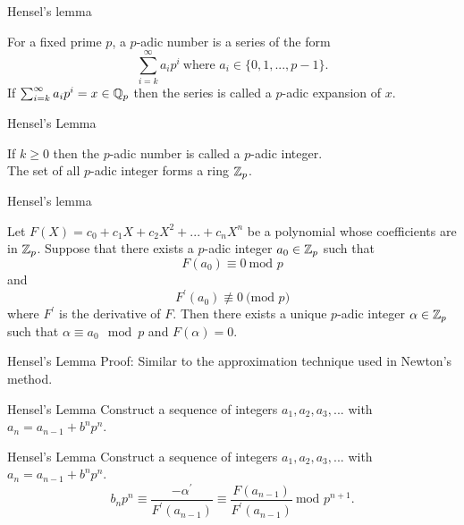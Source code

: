 \documentclass{beamer}
\begin{document}
    \begin{frame}{Hensel's lemma}
    
    \begin{definition}
        For a fixed prime $p$, a $p$-adic number is a series of the form 
\[\sum_{i=k}^{\infty} a_i p^i \ \text{where }a_i \in \{0,1,...,p - 1\}. \]
If $\sum_{i=k}^{\infty} a_i p^i = x \in \mathbb{Q}_p$ then the series is called a $p$-adic expansion of $x$.
    \end{definition}
    
    \end{frame}
    
    \begin{frame}{Hensel's Lemma}
    
    If $k \geq 0 $ then the $p$-adic number is called a $p$-adic integer.\\
    The set of all $p$-adic integer forms a ring $\mathbb{Z}_p$.
        
    \end{frame}
    
    \begin{frame}{Hensel's lemma}
    
    \begin{theorem} Let $F(X) = c_0 + c_1 X + c_2 X^2 + ... + c_n X^n$ be a polynomial whose coefficients are in $\mathbb{Z}_p$. Suppose that there exists a $p$-adic integer $a_0 \in \mathbb{Z}_p$ such that 
\[F(a_0) \equiv 0 \ \text{mod $p$} \]
and 
\[F^{'}(a_0) \not\equiv 0 \  \text{(mod $p$)}\]
where $F^{'}$ is the derivative of $F$. Then there exists a unique $p$-adic integer $\alpha \in \mathbb{Z}_p$ such that $\alpha \equiv a_0 \mod p$ and $F(\alpha) = 0$.
    \end{theorem}
        
    \end{frame}
    
    \begin{frame}{Hensel's Lemma}
    Proof:
        Similar to the approximation technique used in Newton's method.
    \end{frame}
    
    \begin{frame}{Hensel's Lemma}
    Construct a sequence of integers $a_1,a_2,a_3,...$ with $a_n = a_{n-1} + b^n p^n$.\\
    \end{frame}
    
    \begin{frame}{Hensel's Lemma}
    Construct a sequence of integers $a_1,a_2,a_3,...$ with $a_n = a_{n-1} + b^n p^n$.\\
    \[b_n p^n \equiv \frac{-\alpha^{'}}{F^{'}(a_{n-1})} \equiv \frac{F(a_{n-1})}{F^{'}(a_{n-1})} \ \text{mod $p^{n+1}$}. \]
    \end{frame}
    
\end{document}
